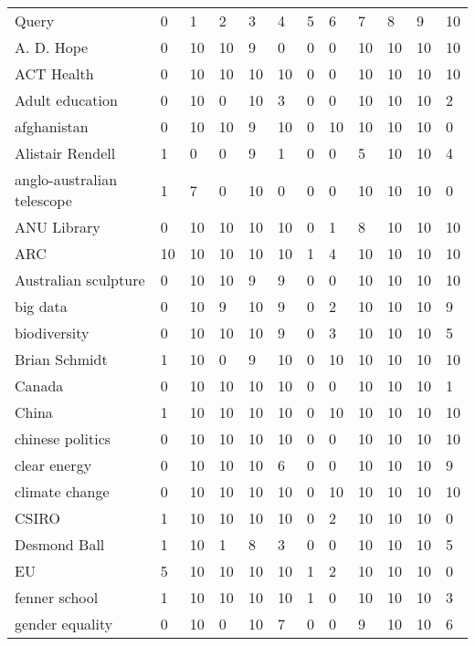 \documentclass[5pt]{article}
\begin{document}
\begin{table}
\begin{tabular*}{0.5\textwidth}{|p{5cm}|l|l|l|l|l|l|l|l|l|l|l|}
\cline{1-12}
Query	& 0 & 1 & 2 & 3 & 4 & 5 & 6 & 7 & 8 & 9 & 10 \\\cline{1-12}
A. D. Hope &0 &10 &10 &9 &0 &0 &0 &10 &10 &10 &10\\
\cline{1-12}
ACT Health &0 &10 &10 &10 &10 &0 &0 &10 &10 &10 &10\\
\cline{1-12}
Adult education &0 &10 &0 &10 &3 &0 &0 &10 &10 &10 &2\\
\cline{1-12}
afghanistan &0 &10 &10 &9 &10 &0 &10 &10 &10 &10 &0\\
\cline{1-12}
Alistair Rendell &1 &0 &0 &9 &1 &0 &0 &5 &10 &10 &4\\
\cline{1-12}
anglo-australian telescope &1 &7 &0 &10 &0 &0 &0 &10 &10 &10 &0\\
\cline{1-12}
ANU Library &0 &10 &10 &10 &10 &0 &1 &8 &10 &10 &10\\
\cline{1-12}
ARC &10 &10 &10 &10 &10 &1 &4 &10 &10 &10 &10\\
\cline{1-12}
Australian sculpture &0 &10 &10 &9 &9 &0 &0 &10 &10 &10 &10\\
\cline{1-12}
big data &0 &10 &9 &10 &9 &0 &2 &10 &10 &10 &9\\
\cline{1-12}
biodiversity &0 &10 &10 &10 &9 &0 &3 &10 &10 &10 &5\\
\cline{1-12}
Brian Schmidt &1 &10 &0 &9 &10 &0 &10 &10 &10 &10 &10\\
\cline{1-12}
Canada &0 &10 &10 &10 &10 &0 &0 &10 &10 &10 &1\\
\cline{1-12}
China &1 &10 &10 &10 &10 &0 &10 &10 &10 &10 &10\\
\cline{1-12}
chinese politics &0 &10 &10 &10 &10 &0 &0 &10 &10 &10 &10\\
\cline{1-12}
clear energy &0 &10 &10 &10 &6 &0 &0 &10 &10 &10 &9\\
\cline{1-12}
climate change &0 &10 &10 &10 &10 &0 &10 &10 &10 &10 &10\\
\cline{1-12}
CSIRO &1 &10 &10 &10 &10 &0 &2 &10 &10 &10 &0\\
\cline{1-12}
Desmond Ball &1 &10 &1 &8 &3 &0 &0 &10 &10 &10 &5\\
\cline{1-12}
EU &5 &10 &10 &10 &10 &1 &2 &10 &10 &10 &0\\
\cline{1-12}
fenner school &1 &10 &10 &10 &10 &1 &0 &10 &10 &10 &3\\
\cline{1-12}
gender equality &0 &10 &0 &10 &7 &0 &0 &9 &10 &10 &6\\

\end{tabular*}
\end{table}
\end{document}
